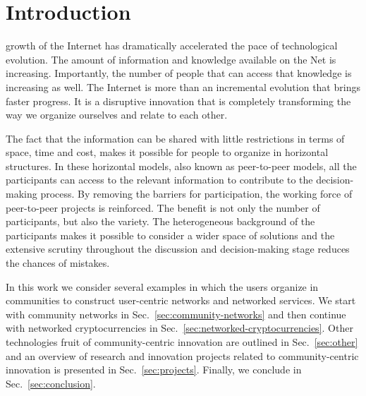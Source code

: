 \documentclass[journal]{IEEEtran}
\begin{document}
%
\IEEEpeerreviewmaketitle



\section{Introduction}
% 
% 
% 
% 
 growth of the Internet has dramatically accelerated the pace of technological evolution.
The amount of information and knowledge available on the Net is increasing.
Importantly,  the number of people that can access that knowledge is increasing as well.
The Internet is more than an incremental evolution that brings faster progress.
It is a disruptive innovation that is completely transforming the way we organize ourselves and relate to each other.

The fact that the information can be shared with little restrictions in terms of space, time and cost, makes it possible for people to organize in horizontal structures.
In these horizontal models, also known as peer-to-peer models, all the participants can access to the relevant information to contribute to the decision-making process.
By removing the barriers for participation, the working force of peer-to-peer projects is reinforced.
The benefit is not only the number of participants, but also the variety.
The heterogeneous background of the participants makes it possible to consider a wider space of solutions and the extensive scrutiny throughout the discussion and decision-making stage reduces the chances of mistakes.

In this work we consider several examples in which the users organize in communities to construct user-centric networks and networked services.
We start with community networks in Sec.~\ref{sec:community-networks} and then continue with networked cryptocurrencies in Sec.~\ref{sec:networked-cryptocurrencies}.
Other technologies fruit of community-centric innovation are outlined in Sec.~\ref{sec:other} and an overview of research and innovation projects related to community-centric innovation is presented in Sec.~\ref{sec:projects}.
Finally, we conclude in Sec.~\ref{sec:conclusion}.
\end{document}
